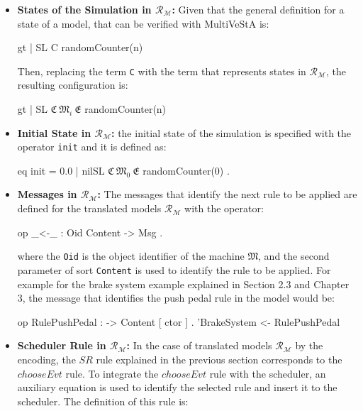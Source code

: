 \begin{itemize}
    \item \textbf{States of the Simulation in $\mathscr{R}_\mathscr{M}$:} Given that the general definition for a state of a model, that can be verified with MultiVeStA is:
    \begin{maude}

{gt | SL} {C randomCounter(n)}\end{maude}
    Then, replacing the term \texttt{C} with the term that represents states in $\mathscr{R}_\mathscr{M}$, the resulting configuration is:
    \begin{maude}
    
{gt | SL} {$\mathfrak{C} \ \mathfrak{M}_{i}  \ \mathfrak{E}$ randomCounter(n)}\end{maude}
    
    \item \textbf{Initial State in $\mathscr{R}_\mathscr{M}$:} the initial state of the simulation is specified with the operator \texttt{init} and it is defined as:
    \begin{maude}

eq init = {0.0 | nilSL} $\mathfrak{C} \ \mathfrak{M}_{0}  \ \mathfrak{E}$ randomCounter(0) .\end{maude}
    
    \item \textbf{Messages in $\mathscr{R}_\mathscr{M}$:} The messages that identify the next rule to be applied are defined for the translated models $\mathscr{R}_\mathscr{M}$ with the operator:
    \begin{maude}

op _<-_ : Oid Content -> Msg .\end{maude}
    
    where the \texttt{Oid} is the object identifier of the machine $\mathfrak{M}$, and the second parameter of sort \texttt{Content} is used to identify the rule to be applied. For example for the brake system example explained in Section 2.3 and Chapter 3, the message that identifies the push pedal rule in the model would be:
    \begin{maude}

op RulePushPedal : -> Content [ ctor ] .
'BrakeSystem <- RulePushPedal\end{maude}

    \item \textbf{Scheduler Rule in $\mathscr{R}_\mathscr{M}$:} In the case of translated models $\mathscr{R}_\mathscr{M}$ by the encoding, the $SR$ rule explained in the previous section corresponds to the $chooseEvt$ rule. To integrate the $chooseEvt$ rule with the scheduler, an auxiliary equation is used to identify the selected rule and insert it to the scheduler. The definition of this rule is:
    \begin{maude}


\end{maude}
\end{itemize}
